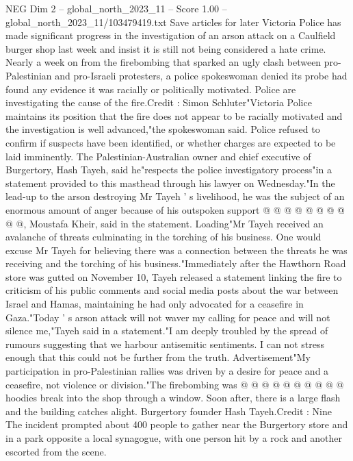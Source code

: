 \begin{textsample}{NEG Dim 2 – global\_north\_2023\_11 – Score 1.00 – global\_north\_2023\_11/103479419.txt}  \label{ex:f2_neg_217}
Save articles for later Victoria Police has made significant progress in the investigation of an arson attack on a Caulfield burger shop last week and insist it is still not being considered a hate crime.
Nearly a week on from the firebombing that sparked an ugly clash between pro-Palestinian and pro-Israeli protesters, a police spokeswoman denied its probe had found any evidence it was racially or politically motivated.
Police are investigating the cause of the fire.Credit : Simon Schluter"Victoria Police maintains its position that the fire does not appear to be racially motivated and the investigation is well advanced,"the spokeswoman said.
Police refused to confirm if suspects have been identified, or whether charges are expected to be laid imminently.
The Palestinian-Australian owner and chief executive of Burgertory, Hash Tayeh, said he"respects the police investigatory process"in a statement provided to this masthead through his lawyer on Wednesday."In the lead-up to the arson destroying Mr Tayeh ' s livelihood, he was the subject of an enormous amount of anger because of his outspoken support @ @ @ @ @ @ @ @ @ @, Moustafa Kheir, said in the statement.
Loading"Mr Tayeh received an avalanche of threats culminating in the torching of his business.
One would excuse Mr Tayeh for believing there was a connection between the threats he was receiving and the torching of his business."Immediately after the Hawthorn Road store was gutted on November 10, Tayeh released a statement linking the fire to criticism of his public comments and social media posts about the war between Israel and Hamas, maintaining he had only advocated for a ceasefire in Gaza."Today ' s arson attack will not waver my calling for peace and will not silence me,"Tayeh said in a statement."I am deeply troubled by the spread of rumours suggesting that we harbour antisemitic sentiments.
I can not stress enough that this could not be further from the truth.
Advertisement"My participation in pro-Palestinian rallies was driven by a desire for peace and a ceasefire, not violence or division."The firebombing was @ @ @ @ @ @ @ @ @ @ hoodies break into the shop through a window.
Soon after, there is a large flash and the building catches alight.
Burgertory founder Hash Tayeh.Credit : Nine The incident prompted about 400 people to gather near the Burgertory store and in a park opposite a local synagogue, with one person hit by a rock and another escorted from the scene.

\end{textsample}
